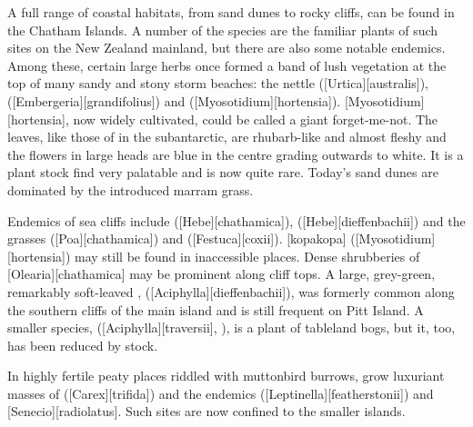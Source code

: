 A full range of coastal habitats, from sand dunes to rocky cliffs, can be found in the Chatham Islands.
A number of the species are the familiar plants of such sites on the New Zealand mainland, but there are also some notable endemics.
Among these, certain large herbs once formed a band of lush vegetation at the top of many sandy and stony storm beaches: the nettle  ([Urtica][australis]),  ([Embergeria][grandifolius]) and  ([Myosotidium][hortensia]).
[Myosotidium][hortensia], now widely cultivated, could be called a giant forget-me-not.
The leaves, like those of  in the subantarctic, are rhubarb-like and almost fleshy and the flowers in large heads are blue in the centre grading outwards to white.
It is a plant stock find very palatable and is now quite rare.
Today's sand dunes are dominated by the introduced marram grass.

Endemics of sea cliffs include  ([Hebe][chathamica]),  ([Hebe][dieffenbachii]) and the grasses  ([Poa][chathamica]) and  ([Festuca][coxii]).
[kopakopa] ([Myosotidium][hortensia]) may still be found in inaccessible places.
Dense shrubberies of [Olearia][chathamica] may be prominent along cliff tops.
A large, grey-green, remarkably soft-leaved ,  ([Aciphylla][dieffenbachii]), was formerly common along the southern cliffs of the main island and is still frequent on Pitt Island.
A smaller species,  ([Aciphylla][traversii], ), is a plant of tableland bogs, but it, too, has been reduced by stock.

In highly fertile peaty places riddled with muttonbird burrows, grow luxuriant masses of  ([Carex][trifida]) and the endemics  ([Leptinella][featherstonii]) and [Senecio][radiolatus].
Such sites are now confined to the smaller islands.

